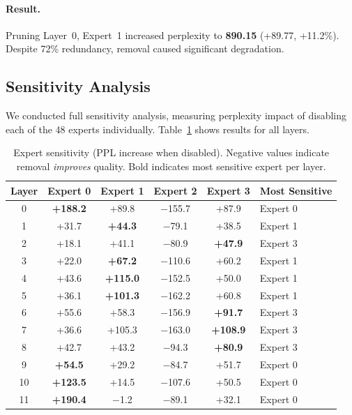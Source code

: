 \documentclass{article}
\begin{document}
\paragraph{Result.}
Pruning Layer~0, Expert~1 increased perplexity to \textbf{890.15} (+89.77, +11.2\%).
Despite 72\% redundancy, removal caused significant degradation.

\subsection{Sensitivity Analysis}

We conducted full sensitivity analysis, measuring perplexity impact of disabling
each of the 48 experts individually.
Table~\ref{tab:sensitivity} shows results for all layers.

\begin{table}[h]
\centering
\caption{Expert sensitivity (PPL increase when disabled). Negative values indicate
removal \emph{improves} quality. Bold indicates most sensitive expert per layer.}
\label{tab:sensitivity}
\small
\begin{tabular}{cccccl}
\toprule
\textbf{Layer} & \textbf{Expert 0} & \textbf{Expert 1} & \textbf{Expert 2} & \textbf{Expert 3} & \textbf{Most Sensitive} \\
\midrule
0  & \textbf{+188.2} & +89.8  & \cellcolor{blue!15}$-$155.7 & +87.9  & Expert 0 \\
1  & +31.7  & \textbf{+44.3}  & \cellcolor{blue!15}$-$79.1  & +38.5  & Expert 1 \\
2  & +18.1  & +41.1  & \cellcolor{blue!15}$-$80.9  & \textbf{+47.9}  & Expert 3 \\
3  & +22.0  & \textbf{+67.2}  & \cellcolor{blue!15}$-$110.6 & +60.2  & Expert 1 \\
4  & +43.6  & \textbf{+115.0} & \cellcolor{blue!15}$-$152.5 & +50.0  & Expert 1 \\
5  & +36.1  & \textbf{+101.3} & \cellcolor{blue!15}$-$162.2 & +60.8  & Expert 1 \\
6  & +55.6  & +58.3  & \cellcolor{blue!15}$-$156.9 & \textbf{+91.7}  & Expert 3 \\
7  & +36.6  & +105.3 & \cellcolor{blue!15}$-$163.0 & \textbf{+108.9} & Expert 3 \\
8  & +42.7  & +43.2  & \cellcolor{blue!15}$-$94.3  & \textbf{+80.9}  & Expert 3 \\
9  & \textbf{+54.5}  & +29.2  & \cellcolor{blue!15}$-$84.7  & +51.7  & Expert 0 \\
10 & \textbf{+123.5} & +14.5  & \cellcolor{blue!15}$-$107.6 & +50.5  & Expert 0 \\
11 & \textbf{+190.4} & $-$1.2   & \cellcolor{blue!15}$-$89.1  & +32.1  & Expert 0 \\
\bottomrule
\end{tabular}
\end{table}
\end{document}
